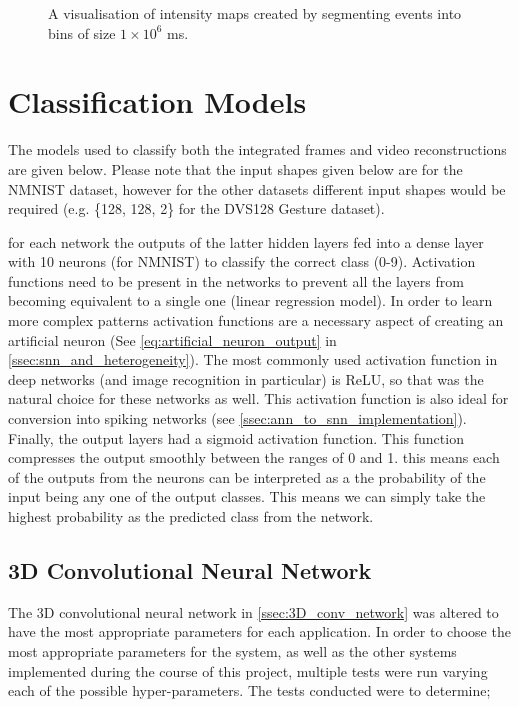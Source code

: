 \begin{figure}[htb]
    \caption{A visualisation of intensity maps created by segmenting events into bins of size $ 1 \times 10^6 $ ms.}%
    \label{fig:nmnist_spikes_to_intensity_map}%
\end{figure}

\section{Classification Models}

The models used to classify both the integrated frames and video reconstructions are given below. Please note that the input shapes given below are for the NMNIST dataset, however for the other datasets different input shapes would be required (e.g. \{128, 128, 2\} for the DVS128 Gesture dataset).

for each network the outputs of the latter hidden layers fed into a dense layer with 10 neurons (for NMNIST) to classify the correct class (0-9). Activation functions need to be present in the networks to prevent all the layers from becoming equivalent to a single one (linear regression model). In order to learn more complex patterns activation functions are a necessary aspect of creating an artificial neuron (See \cref{eq:artificial_neuron_output} in \cref{ssec:snn_and_heterogeneity}). The most commonly used activation function in deep networks (and image recognition in particular) is ReLU, so that was the natural choice for these networks as well. This activation function is also ideal for conversion into spiking networks (see \cref{ssec:ann_to_snn_implementation}). Finally, the output layers had a sigmoid activation function. This function compresses the output smoothly between the ranges of 0 and 1. this means each of the outputs from the neurons can be interpreted as a the probability of the input being any one of the output classes. This means we can simply take the highest probability as the predicted class from the network.

\subsection{3D Convolutional Neural Network}

The 3D convolutional neural network in \cref{ssec:3D_conv_network} was altered to have the most appropriate parameters for each application. In order to choose the most appropriate parameters for the system, as well as the other systems implemented during the course of this project, multiple tests were run varying each of the possible hyper-parameters. The tests conducted were to determine;


